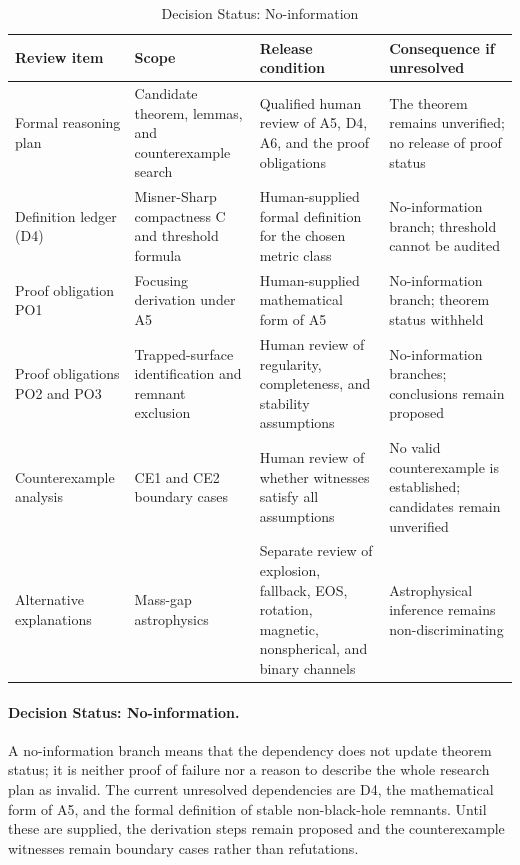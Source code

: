 \documentclass[conference]{IEEEtran}
\begin{document}
\begin{table}[htbp]
\centering
\footnotesize
\setlength{\tabcolsep}{3pt}
\renewcommand{\arraystretch}{1.12}
\caption{Decision Status: No-information}
\label{tab:risk-limitations-and-review-rlr-review-matrix}
\begin{tabular}{|p{}|p{}|p{}|p{}|}
\hline
Review item & Scope & Release condition & Consequence if unresolved \\\hline
Formal reasoning plan & Candidate theorem, lemmas, and counterexample search & Qualified human review of A5, D4, A6, and the proof obligations & The theorem remains unverified; no release of proof status \\\hline
Definition ledger (D4) & Misner-Sharp compactness C and threshold formula & Human-supplied formal definition for the chosen metric class & No-information branch; threshold cannot be audited \\\hline
Proof obligation PO1 & Focusing derivation under A5 & Human-supplied mathematical form of A5 & No-information branch; theorem status withheld \\\hline
Proof obligations PO2 and PO3 & Trapped-surface identification and remnant exclusion & Human review of regularity, completeness, and stability assumptions & No-information branches; conclusions remain proposed \\\hline
Counterexample analysis & CE1 and CE2 boundary cases & Human review of whether witnesses satisfy all assumptions & No valid counterexample is established; candidates remain unverified \\\hline
Alternative explanations & Mass-gap astrophysics & Separate review of explosion, fallback, EOS, rotation, magnetic, nonspherical, and binary channels & Astrophysical inference remains non-discriminating \\\hline
\end{tabular}
\end{table}

\paragraph{Decision Status: No-information.} A no-information branch means that the dependency does not update theorem status; it is neither proof of failure nor a reason to describe the whole research plan as invalid. The current unresolved dependencies are D4, the mathematical form of A5, and the formal definition of stable non-black-hole remnants. Until these are supplied, the derivation steps remain proposed and the counterexample witnesses remain boundary cases rather than refutations.
\end{document}
